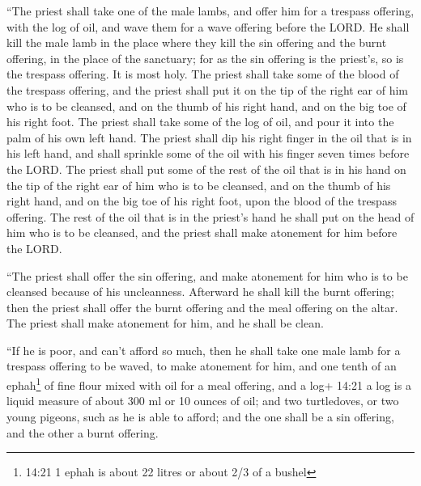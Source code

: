  ``The priest shall take one of the male lambs, and offer
him for a trespass offering, with the log of oil, and wave them for a
wave offering before the LORD.  He shall kill the male lamb
in the place where they kill the sin offering and the burnt offering, in
the place of the sanctuary; for as the sin offering is the priest's, so
is the trespass offering. It is most holy.  The priest
shall take some of the blood of the trespass offering, and the priest
shall put it on the tip of the right ear of him who is to be cleansed,
and on the thumb of his right hand, and on the big toe of his right
foot.  The priest shall take some of the log of oil, and
pour it into the palm of his own left hand.  The priest
shall dip his right finger in the oil that is in his left hand, and
shall sprinkle some of the oil with his finger seven times before the
LORD.  The priest shall put some of the rest of the oil
that is in his hand on the tip of the right ear of him who is to be
cleansed, and on the thumb of his right hand, and on the big toe of his
right foot, upon the blood of the trespass offering.  The
rest of the oil that is in the priest's hand he shall put on the head of
him who is to be cleansed, and the priest shall make atonement for him
before the LORD.

 ``The priest shall offer the sin offering, and make
atonement for him who is to be cleansed because of his uncleanness.
Afterward he shall kill the burnt offering;  then the
priest shall offer the burnt offering and the meal offering on the
altar. The priest shall make atonement for him, and he shall be clean.

 ``If he is poor, and can't afford so much, then he shall
take one male lamb for a trespass offering to be waved, to make
atonement for him, and one tenth of an ephah\footnote{14:21 1 ephah is
  about 22 litres or about 2/3 of a bushel} of fine flour mixed with oil
for a meal offering, and a log+ 14:21 a log is a liquid measure of about
300 ml or 10 ounces of oil;  and two turtledoves, or two
young pigeons, such as he is able to afford; and the one shall be a sin
offering, and the other a burnt offering.

